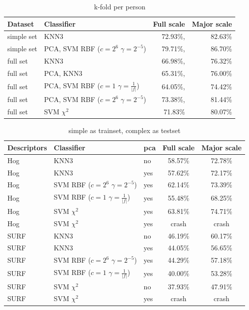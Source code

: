 \begin{table}
\centering
\begin{tabular}{llrr}
\hline\hline
Dataset & Classifier 				&  	Full scale	& Major scale	\\
\hline
simple set	& KNN3	& 72.93\%, & 82.63\%	\\
simple set	& PCA, SVM RBF ($c=2^6$ $\gamma=2^{-5}$) & 79.71\%, & 86.70\%	\\
full set	& KNN3 & 66.98\%, & 76.32\%	\\
full set	& PCA, KNN3 & 65.31\%, & 76.00\%	\\
full set	& PCA, SVM RBF ($c=1$ $\gamma=\frac{1}{|f|}$) & 64.05\%, & 74.42\%	\\
full set	& PCA, SVM RBF ($c=2^6$ $\gamma=2^{-5}$)& 73.38\%, & 81.44\%	\\
full set    & SVM $\chi^2$ &  71.83\% &80.07\% \\
\hline
\end{tabular}
\caption{k-fold per person}
\label{tab:perperson}
\end{table}


\begin{table}
\centering
\begin{tabular}{lllcc}
\hline\hline
Descriptors & Classifier 		& pca		&  	Full scale	&	Major scale	\\
\hline
Hog & KNN3				& no	&	58.57\% 	&	72.78\%	\\
Hog & KNN3 				& yes	&	57.62\% 	&	72.17\%	\\
Hog & SVM RBF ($c=2^6$ $\gamma=2^{-5}$)			& yes & 62.14\%	&	73.39\%	\\
Hog & SVM RBF ($c=1$ $\gamma=\frac{1}{|f|}$)	& yes & 55.48\%	&	68.25\%	\\
Hog & SVM $\chi^2$ 		&	yes	&	63.81\%	&	74.71\%	\\
Hog & SVM $\chi^2$		&	yes &	crash 	&	crash \\
\hline
SURF & KNN3				&	no	&	46.19\% 	&	60.17\%	\\
SURF & KNN3										& yes &	44.05\% & 56.65\% \\
SURF & SVM RBF ($c=2^6$ $\gamma=2^{-5}$)		& yes &	44.29\%	&	57.18\%	\\
SURF & SVM RBF ($c=1$ $\gamma=\frac{1}{|f|}$)	& yes &	40.00\%	&	53.28\%	\\
SURF & SVM $\chi^2$								& no  &	37.93\%		&	47.91\%	\\
SURF & SVM $\chi^2$		&	yes	&	crash 	&	crash \\
\hline
\end{tabular}
\caption{simple as trainset, complex as testset}
\label{tab:perset}
\end{table}





